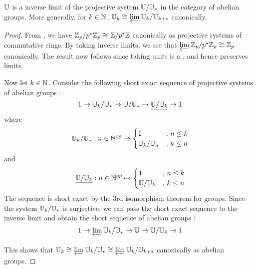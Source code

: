\begin{prop}
  
  $\mathbb{U}$ is a inverse limit of the projective system $\mathbb{U}/\mathbb{U}_\star$
  in the category of abelian groups. 
  More generally, for $k \in \mathbb{N}$, 
  $\mathbb{U}_k \cong_{} \varprojlim_{{}} \mathbb{U}_k / \mathbb{U}_{k + \star}$ canonically.
\end{prop}
\begin{proof} 
  From , 
  we have $\mathbb{Z}_p/p^\star\mathbb{Z}_p \cong_{} \mathbb{Z}/p^\star\mathbb{Z}$ canonically as 
  projective systems of commutative rings. 
  By taking inverse limits, 
  we see that $\varprojlim_{{}} \mathbb{Z}_p/p^\star\mathbb{Z}_p \cong_{} \mathbb{Z}_p$ canonically. 
  The result now follows since taking units is a 
  ,
  and hence preserves limits. 

  Now let $k \in \mathbb{N}$. 
  Consider the following short exact sequence of projective systems 
  of abelian groups : 
  \[
    1 \to \mathbb{U}_k / \mathbb{U}_\star \to \mathbb{U} / \mathbb{U}_\star \to \underline{\mathbb{U} / \mathbb{U}_k} \to 1
  \]
  where \[
    \mathbb{U}_k / \mathbb{U}_\star : n \in \mathbb{N}^{op} \mapsto
    \begin{cases}
      1 &,\, n \leq k \\
      \mathbb{U}_k / \mathbb{U}_n &,\, k \leq n
    \end{cases}
  \]
  and \[
    \underline{\mathbb{U}/\mathbb{U}_k} : n\in\mathbb{N}^{op} \mapsto 
    \begin{cases}
      1 &,\, n \leq k \\
      \mathbb{U}/\mathbb{U}_k &,\, k \leq n
    \end{cases}
  \]
  The sequence is short exact by the 3rd isomorphism theorem for groups. 
  Since the system $\mathbb{U}_k/\mathbb{U}_\star$ is surjective, 
  we can pass the short exact sequence to the inverse limit and obtain 
  the short sequence of abelian groups : 
  \[
    1 \to \varprojlim_{{}}{}\mathbb{U}_k/\mathbb{U}_\star \to \mathbb{U} \to \mathbb{U}/\mathbb{U}_k \to 1
  \]
  This shows that
  $\mathbb{U}_k \cong_{} \varprojlim_{{}}{\mathbb{U}_k/\mathbb{U}_\star} \cong_{} \varprojlim_{{}}{\mathbb{U}_k/\mathbb{U}_{k + \star}}$ canonically
  as abelian groups.
\end{proof}


